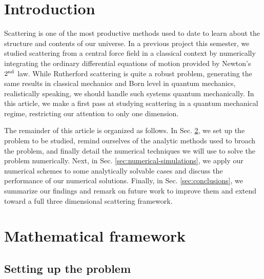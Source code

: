 
\def\HWnum{Final Project}
\def\duedate{December 9, 2024}




\section{Introduction}
\label{sec:introduction}

Scattering is one of the most productive methods used to date to learn about the structure and contents of our universe.
In a previous project this semester, we studied scattering from a central force field in a classical context by numerically integrating the ordinary differential equations of motion provided by Newton's $2^{\rm nd}$ law.
While Rutherford scattering is quite a robust problem, generating the same results in classical mechanics and Born level in quantum mechanics, realistically speaking, we should handle such systems quantum mechanically.
In this article, we make a first pass at studying scattering in a quantum mechanical regime, restricting our attention to only one dimension.

The remainder of this article is organized as follows.
In Sec. \ref{sec:mathematical-framework}, we set up the problem to be studied, remind ourselves of the analytic methods used to broach the problem, and finally detail the numerical techniques we will use to solve the problem numerically.
Next, in Sec. \ref{sec:numerical-simulations}, we apply our numerical schemes to some analytically solvable cases and discuss the performance of our numerical solutions.
Finally, in Sec. \ref{sec:conclusions}, we summarize our findings and remark on future work to improve them and extend toward a full three dimensional scattering framework.


\section{Mathematical framework}
\label{sec:mathematical-framework}


\subsection{Setting up the problem}

